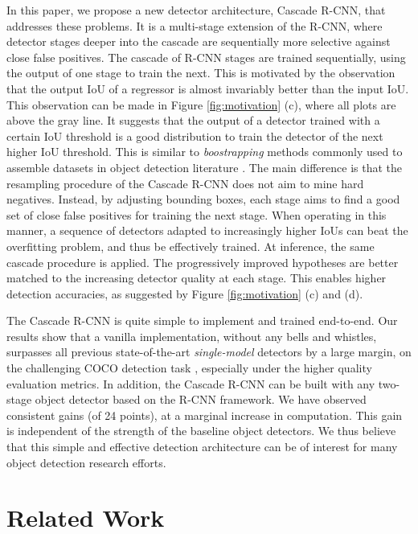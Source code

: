 \documentclass[10pt,twocolumn,letterpaper]{article}
\begin{document}
In this paper, we propose a new detector architecture, Cascade R-CNN,
that addresses these problems. It is a multi-stage extension of the
R-CNN, where detector stages deeper into the cascade are sequentially more
selective against close false positives. The cascade of R-CNN stages are
trained sequentially, using the output of one stage to train the next. This
is motivated by the observation that the output IoU of a regressor is
almost invariably better than the input IoU. This observation can be made
in Figure \ref{fig:motivation} (c), where all plots are above the gray
line. It suggests that the output of a detector trained with a certain
IoU threshold is a good distribution to train the detector of the next
higher IoU threshold. This is similar to {\it boostrapping\/} methods
commonly used to assemble datasets in object detection
literature \cite{DBLP:journals/ijcv/ViolaJ04,DBLP:journals/pami/FelzenszwalbGMR10}. The main difference is that the resampling procedure of the
Cascade R-CNN does not aim to mine hard negatives. Instead, by adjusting
bounding boxes, each stage aims to find a good set of close false positives
for training the next stage. When operating in this manner, a sequence of
detectors adapted to increasingly higher IoUs can beat the overfitting
problem, and thus be effectively trained. At inference, the same cascade
procedure is applied. The progressively improved hypotheses are better
matched to the increasing detector quality at each stage. This enables
higher detection accuracies, as suggested by Figure \ref{fig:motivation} (c)
and (d).

The Cascade R-CNN is quite simple to implement and trained end-to-end.
Our results show that a vanilla implementation, without any bells and whistles,
surpasses all previous state-of-the-art \emph{single-model} detectors by a
large margin, on the challenging COCO detection
task \cite{DBLP:conf/eccv/LinMBHPRDZ14}, especially under the higher quality
evaluation metrics. In addition, the Cascade R-CNN can be built with any
two-stage object detector based on the R-CNN framework. We have
observed consistent gains (of 24 points), at a marginal increase in
computation. This gain is independent of the strength of the baseline object
detectors. We thus believe that this simple and effective detection
architecture can be of interest for many object detection research efforts.


\section{Related Work}
\end{document}

